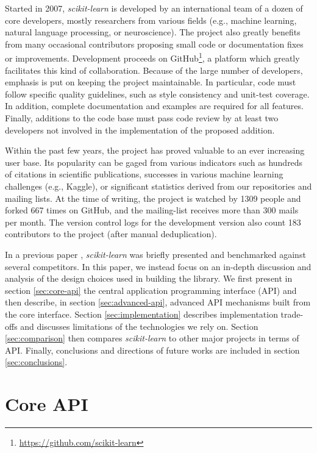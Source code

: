 \documentclass{llncs}
\newcommand{\sklearn}{\textit{scikit-learn}\xspace}
\begin{document}
Started in 2007, \sklearn is developed by an international team of a dozen of
core developers, mostly researchers from various fields (e.g., machine learning,
natural language processing, or neuroscience). The project also greatly benefits
from many occasional contributors proposing small code or documentation fixes or
improvements. Development proceeds on GitHub\footnote{\url{https://github.com/scikit-learn}},
a platform which greatly facilitates this kind of
collaboration. Because of the large number of developers, emphasis is
put on keeping the project maintainable. In particular, code must follow
specific quality guidelines, such as style consistency and unit-test coverage.
In addition, complete documentation and examples are required for all features.
Finally, additions to the code base must pass code review by at least two
developers not involved in the implementation of the proposed addition.

Within the past few years, the project has proved valuable to an ever increasing
user base. Its popularity can be gaged from various indicators such as hundreds
of citations in scientific publications, successes in various machine learning
challenges (e.g., Kaggle), or significant statistics derived from our
repositories and mailing lists.  At the time of writing, the project is watched
by 1309 people and forked 667 times on GitHub, and the mailing-list receives
more than 300 mails per month. The version control logs for the development
version
also count 183 contributors to the project (after manual deduplication).

In a previous paper \citep{pedregosa2011}, \sklearn was briefly presented and
benchmarked against several competitors. In this paper, we instead focus on an
in-depth discussion and analysis of the design choices used in building the
library. We first present in section \ref{sec:core-api} the central application
programming interface (API) and then describe, in section \ref{sec:advanced-api},
advanced API mechanisms built from the core interface. Section
\ref{sec:implementation} describes implementation trade-offs and discusses
limitations of the technologies we rely on. Section \ref{sec:comparison}
then compares \emph{scikit-learn} to other major projects in terms of API.
Finally, conclusions and directions of future works are included in section
\ref{sec:conclusions}.

\section{Core API}
\end{document}
